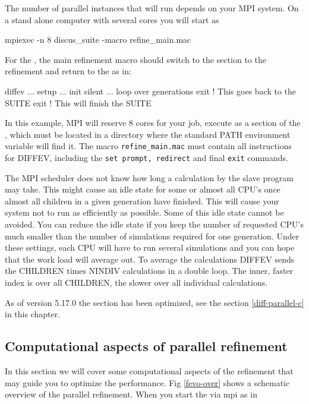 The number of parallel instances that will run depends on your MPI system. 
On a stand alone computer with several cores you will start \Diffev as 

\begin{MacVerbatim}
   mpiexec -n 8 discus_suite -macro refine_main.mac
\end{MacVerbatim}

For the \Suite, the main refinement macro should switch to the \Diffev
section to the refinement and return to the \Suite as in: 

\begin{MacVerbatim}
diffev
... setup
... init silent
... loop over generations
exit   ! This goes back to the SUITE
exit   ! This will finish the SUITE
\end{MacVerbatim}


In this example, MPI will reserve 8 cores for your job, execute \Diffev 
as a section of the \Suite, which 
must be located in a directory where the standard PATH environment variable will 
find it. The macro {\tt refine\_main.mac} must contain all instructions 
for DIFFEV, including the {\tt set prompt, redirect} and final {\tt exit} 
commands.

The MPI scheduler does not know how long a calculation by the slave program
may take. This might cause an idle state for some or almost all CPU's once 
almost all children in a given generation have finished. This will cause 
your system not to run as efficiently as possible. Some of this idle state
cannot be avoided. You can reduce the idle state if you keep the number of 
requested CPU's much smaller than the number of simulations required for
one generation. Under these settings, each CPU will have to run several 
simulations and you can hope that the work load will average out. To average
the calculations DIFFEV sends the CHILDREN times NINDIV calculations in
a double loop. The inner, faster index is over all CHILDREN, the slower over 
all individual calculations.

As of version 5.17.0 the \Diffev section has been optimized, see the 
section \ref{diff-parallel-c} in this chapter.

\subsection{Computational aspects of parallel refinement \label{diff-parallel-c}}

In this section we will cover some computational aspects of the refinement
that may guide you to optimize the performance. Fig \ref{fevo-over} shows a
schematic overview of the parallel refinement. When you start the \Suite
via mpi as in

